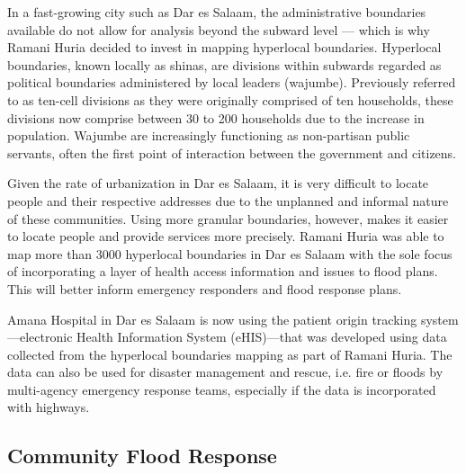 \documentclass[a4paper,12pt,twoside]{article}
\begin{document}
\begin{multicols}{2}
In a fast-growing city such as Dar es Salaam, the administrative boundaries available do not allow for analysis beyond the subward level --- which is why Ramani Huria decided to invest in mapping hyperlocal boundaries. Hyperlocal boundaries, known locally as shinas, are divisions within subwards regarded as political boundaries administered by local leaders (wajumbe). Previously referred to as ten-cell divisions as they were originally comprised of ten households, these divisions now comprise between 30 to 200 households due to the increase in population. Wajumbe are increasingly functioning as non-partisan public servants, often the first point of interaction between the government and citizens.

Given the rate of urbanization in Dar es Salaam, it is very difficult to locate people and their respective addresses due to the unplanned and informal nature of these communities. Using more granular boundaries, however, makes it easier to locate people and provide services more precisely. Ramani Huria was able to map more than 3000 hyperlocal boundaries in Dar es Salaam with the sole focus of incorporating a layer of health access information and issues to flood plans. This will better inform emergency responders and flood response plans. 

Amana Hospital in Dar es Salaam is now using the patient origin tracking system---electronic Health Information System (eHIS)---that was developed using data collected from the hyperlocal boundaries mapping as part of Ramani Huria. The data can also be used for disaster management and rescue, i.e. fire or floods by multi-agency emergency response teams, especially if the data is incorporated with highways.
\end{multicols}

\newpage
\setlength{\parskip}{0.7em}
\subsection{Community Flood Response}
\end{document}
